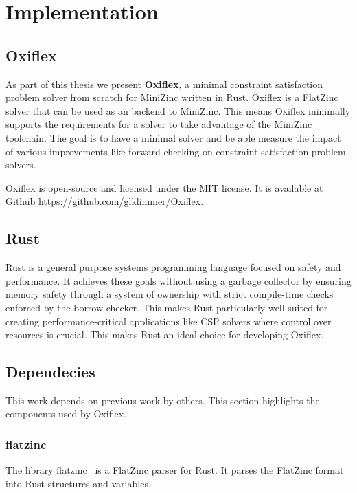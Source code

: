 \chapter{Implementation} \label{chap:impl}

\section{Oxiflex}

As part of this thesis we present \textbf{Oxiflex}, a minimal constraint satisfaction problem solver from scratch for MiniZinc written in Rust. Oxiflex is a FlatZinc solver that can be used as an backend to MiniZinc. This means Oxiflex minimally supports the requirements for a solver to take advantage of the MiniZinc toolchain. The goal is to have a minimal solver and be able measure the impact of various improvements like forward checking on constraint satisfaction problem solvers.

Oxiflex is open-source and licensed under the MIT license. It is available at Github \url{https://github.com/glklimmer/Oxiflex}.

\section{Rust}

Rust \cite{rust:2014} is a general purpose systems programming language focused on safety and performance. It achieves these goals without using a garbage collector by ensuring memory safety through a system of ownership with strict compile-time checks enforced by the borrow checker. This makes Rust particularly well-suited for creating performance-critical applications like CSP solvers where control over resources is crucial. This makes Rust an ideal choice for developing Oxiflex.

\section{Dependecies}

This work depends on previous work by others. This section highlights the components used by Oxiflex.

\subsection{flatzinc} \label{flatzinc}

The library flatzinc~\cite{flatzinc:2020} is a FlatZinc parser for Rust. It parses the FlatZinc format into Rust structures and variables.


